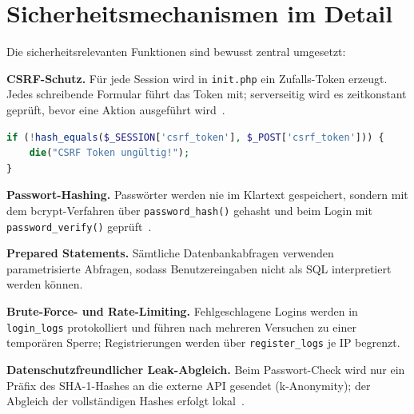 \section{Sicherheitsmechanismen im Detail}
Die sicherheitsrelevanten Funktionen sind bewusst zentral umgesetzt:

\textbf{CSRF-Schutz.} F\"ur jede Session wird in \texttt{init.php} ein Zufalls-Token erzeugt. Jedes
schreibende Formular f\"uhrt das Token mit; serverseitig wird es zeitkonstant gepr\"uft, bevor eine
Aktion ausgef\"uhrt wird~\autocite{owasp-csrf}.

\begin{lstlisting}[language=PHP,caption={Zeitkonstante CSRF-Pr\"ufung (Auszug \texttt{admin.php})},label={lst:a-csrf}]
if (!hash_equals($_SESSION['csrf_token'], $_POST['csrf_token'])) {
    die("CSRF Token ungültig!");
}
\end{lstlisting}

\textbf{Passwort-Hashing.} Passw\"orter werden nie im Klartext gespeichert, sondern mit dem
bcrypt-Verfahren \"uber \texttt{password\_hash()} gehasht und beim Login mit
\texttt{password\_verify()} gepr\"uft~\autocite{php-passwordhash}.

\textbf{Prepared Statements.} S\"amtliche Datenbankabfragen verwenden parametrisierte Abfragen,
sodass Benutzereingaben nicht als SQL interpretiert werden k\"onnen.

\textbf{Brute-Force- und Rate-Limiting.} Fehlgeschlagene Logins werden in \texttt{login\_logs}
protokolliert und f\"uhren nach mehreren Versuchen zu einer tempor\"aren Sperre; Registrierungen
werden \"uber \texttt{register\_logs} je IP begrenzt.

\textbf{Datenschutzfreundlicher Leak-Abgleich.} Beim Passwort-Check wird nur ein Pr\"afix des
SHA-1-Hashes an die externe API gesendet (k-Anonymity); der Abgleich der vollst\"andigen Hashes
erfolgt lokal~\autocite{hibp-range}.
